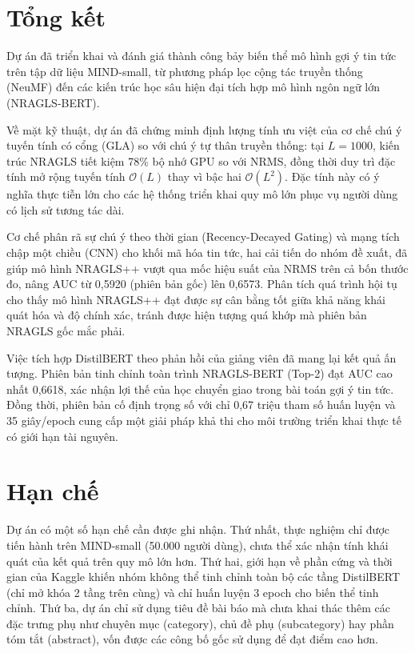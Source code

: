 \documentclass[../BTL.tex]{subfiles}
\begin{document}
\section{Tổng kết}

Dự án đã triển khai và đánh giá thành công bảy biến thể mô hình gợi ý tin tức trên tập dữ liệu MIND-small, từ phương pháp lọc cộng tác truyền thống (NeuMF) đến các kiến trúc học sâu hiện đại tích hợp mô hình ngôn ngữ lớn (NRAGLS-BERT).

Về mặt kỹ thuật, dự án đã chứng minh định lượng tính ưu việt của cơ chế chú ý tuyến tính có cổng (GLA) so với chú ý tự thân truyền thống: tại $L=1000$, kiến trúc NRAGLS tiết kiệm 78\% bộ nhớ GPU so với NRMS, đồng thời duy trì đặc tính mở rộng tuyến tính $\mathcal{O}(L)$ thay vì bậc hai $\mathcal{O}(L^2)$. Đặc tính này có ý nghĩa thực tiễn lớn cho các hệ thống triển khai quy mô lớn phục vụ người dùng có lịch sử tương tác dài.

Cơ chế phân rã sự chú ý theo thời gian (Recency-Decayed Gating) và mạng tích chập một chiều (CNN) cho khối mã hóa tin tức, hai cải tiến do nhóm đề xuất, đã giúp mô hình NRAGLS++ vượt qua mốc hiệu suất của NRMS trên cả bốn thước đo, nâng AUC từ 0,5920 (phiên bản gốc) lên 0,6573. Phân tích quá trình hội tụ cho thấy mô hình NRAGLS++ đạt được sự cân bằng tốt giữa khả năng khái quát hóa và độ chính xác, tránh được hiện tượng quá khớp mà phiên bản NRAGLS gốc mắc phải.

Việc tích hợp DistilBERT theo phản hồi của giảng viên đã mang lại kết quả ấn tượng. Phiên bản tinh chỉnh toàn trình NRAGLS-BERT (Top-2) đạt AUC cao nhất 0,6618, xác nhận lợi thế của học chuyển giao trong bài toán gợi ý tin tức. Đồng thời, phiên bản cố định trọng số với chỉ 0,67 triệu tham số huấn luyện và 35 giây/epoch cung cấp một giải pháp khả thi cho môi trường triển khai thực tế có giới hạn tài nguyên.

\section{Hạn chế}

Dự án có một số hạn chế cần được ghi nhận. Thứ nhất, thực nghiệm chỉ được tiến hành trên MIND-small (50.000 người dùng), chưa thể xác nhận tính khái quát của kết quả trên quy mô lớn hơn. Thứ hai, giới hạn về phần cứng và thời gian của Kaggle khiến nhóm không thể tinh chỉnh toàn bộ các tầng DistilBERT (chỉ mở khóa 2 tầng trên cùng) và chỉ huấn luyện 3 epoch cho biến thể tinh chỉnh. Thứ ba, dự án chỉ sử dụng tiêu đề bài báo mà chưa khai thác thêm các đặc trưng phụ như chuyên mục (category), chủ đề phụ (subcategory) hay phần tóm tắt (abstract), vốn được các công bố gốc sử dụng để đạt điểm cao hơn.
\end{document}
